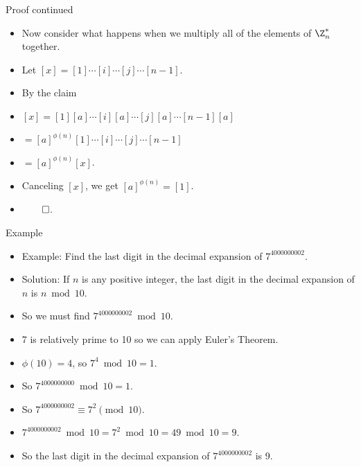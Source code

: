 \documentclass{beamer}
\begin{document}
\begin{frame}{Proof continued}

\begin{itemize}
  \item Now consider what happens when we multiply all of the elements of $\Z^*_n$ together.
  \item Let $[x] = [1]\cdots [i]\cdots [j]\cdots[n-1]$.
  \item By the claim
  \item $[x] = [1][a]\cdots[i][a]\cdots[j][a]\cdots[n-1][a]$
  \item  $=[a]^{\phi(n)}[1]\cdots[i]\cdots[j]\cdots[n-1]$
  \item $=[a]^{\phi(n)}[x]$.
  \item Canceling $[x]$, we get $[a]^{\phi(n)}=[1]$.
  \item $\qed$.
\end{itemize}

\end{frame}

\begin{frame}{Example}
\begin{itemize}
\item Example: Find the last digit in the decimal expansion of $7^{4000000002}$.
\item Solution: If $n$ is any positive integer, the last digit in the decimal
expansion of $n$ is $n\bmod 10$.
\item So we must find $7^{4000000002} \bmod 10$.
\item 7 is relatively prime to 10 so we can apply Euler's Theorem.
\item $\phi(10) = 4$, so $7^4 \bmod 10 = 1$.
\item So $7^{4000000000} \bmod 10 = 1$.
\item So $7^{4000000002} \equiv 7^2 \pmod{10}$.
\item $7^{4000000002} \bmod 10 = 7^2 \bmod 10 = 49 \bmod 10 = 9$.
\item So the last digit in the decimal expansion of $7^{4000000002}$ is 9.
\end{itemize}
\end{frame}
\end{document}

